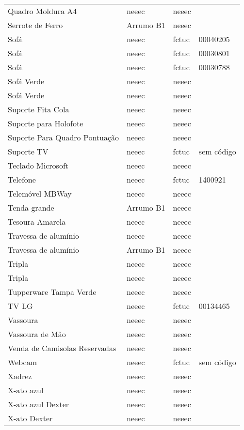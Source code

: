 \begin{longtable}{Xlll}
Quadro Moldura A4 & \acrshort{neeec} & \acrshort{neeec} & \\
Serrote de Ferro & Arrumo B1 & \acrshort{neeec} & \\
Sofá & \acrshort{neeec} & \acrshort{fctuc} & 00040205\\
Sofá & \acrshort{neeec} & \acrshort{fctuc} & 00030801\\
Sofá & \acrshort{neeec} & \acrshort{fctuc} & 00030788\\
Sofá Verde & \acrshort{neeec} & \acrshort{neeec} & \\
Sofá Verde & \acrshort{neeec} & \acrshort{neeec} & \\
Suporte Fita Cola & \acrshort{neeec} & \acrshort{neeec} & \\
Suporte para Holofote & \acrshort{neeec} & \acrshort{neeec} & \\
Suporte Para Quadro Pontuação & \acrshort{neeec} & \acrshort{neeec} & \\
Suporte TV & \acrshort{neeec} & \acrshort{fctuc} & sem código\\
Teclado Microsoft & \acrshort{neeec} & \acrshort{neeec} & \\
Telefone & \acrshort{neeec} & \acrshort{fctuc} & 1400921\\
Telemóvel MBWay & \acrshort{neeec} & \acrshort{neeec} & \\
Tenda grande & Arrumo B1 & \acrshort{neeec} & \\
Tesoura Amarela & \acrshort{neeec} & \acrshort{neeec} & \\
Travessa de alumínio & \acrshort{neeec} & \acrshort{neeec} & \\
Travessa de alumínio & Arrumo B1 & \acrshort{neeec} & \\
Tripla & \acrshort{neeec} & \acrshort{neeec} & \\
Tripla & \acrshort{neeec} & \acrshort{neeec} & \\
Tupperware Tampa Verde & \acrshort{neeec} & \acrshort{neeec} & \\
TV LG & \acrshort{neeec} & \acrshort{fctuc} & 00134465\\
Vassoura & \acrshort{neeec} & \acrshort{neeec} & \\
Vassoura de Mão & \acrshort{neeec} & \acrshort{neeec} & \\
Venda de Camisolas Reservadas & \acrshort{neeec} & \acrshort{neeec} & \\
Webcam & \acrshort{neeec} & \acrshort{fctuc} & sem código\\
Xadrez & \acrshort{neeec} & \acrshort{neeec} & \\
X-ato azul & \acrshort{neeec} & \acrshort{neeec} & \\
X-ato azul Dexter & \acrshort{neeec} & \acrshort{neeec} & \\
X-ato Dexter & \acrshort{neeec} & \acrshort{neeec} & \\

\end{longtable}